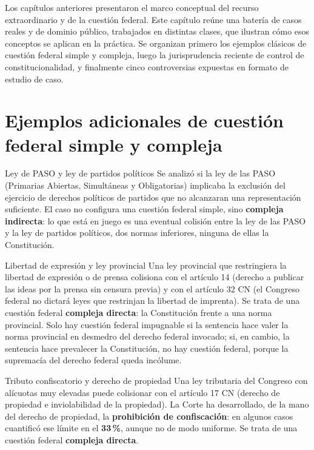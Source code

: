 \documentclass[12pt,oneside]{book}
\begin{document}
Los capítulos anteriores presentaron el marco conceptual del recurso extraordinario y de la cuestión federal. Este capítulo reúne una batería de casos reales y de dominio público, trabajados en distintas clases, que ilustran cómo esos conceptos se aplican en la práctica. Se organizan primero los ejemplos clásicos de cuestión federal simple y compleja, luego la jurisprudencia reciente de control de constitucionalidad, y finalmente cinco controversias expuestas en formato de estudio de caso.

\section{Ejemplos adicionales de cuestión federal simple y compleja}

\begin{example}{Ley de PASO y ley de partidos políticos}
Se analizó si la ley de las PASO (Primarias Abiertas, Simultáneas y Obligatorias) implicaba la exclusión del ejercicio de derechos políticos de partidos que no alcanzaran una representación suficiente. El caso no configura una cuestión federal simple, sino \textbf{compleja indirecta}: lo que está en juego es una eventual colisión entre la ley de las PASO y la ley de partidos políticos, dos normas inferiores, ninguna de ellas la Constitución.
\end{example}

\begin{example}{Libertad de expresión y ley provincial}
Una ley provincial que restringiera la libertad de expresión o de prensa colisiona con el artículo 14 (derecho a publicar las ideas por la prensa sin censura previa) y con el artículo 32 CN (el Congreso federal no dictará leyes que restrinjan la libertad de imprenta). Se trata de una cuestión federal \textbf{compleja directa}: la Constitución frente a una norma provincial. Solo hay cuestión federal impugnable si la sentencia hace valer la norma provincial en desmedro del derecho federal invocado; si, en cambio, la sentencia hace prevalecer la Constitución, no hay cuestión federal, porque la supremacía del derecho federal queda incólume.
\end{example}

\begin{example}{Tributo confiscatorio y derecho de propiedad}
Una ley tributaria del Congreso con alícuotas muy elevadas puede colisionar con el artículo 17 CN (derecho de propiedad e inviolabilidad de la propiedad). La Corte ha desarrollado, de la mano del derecho de propiedad, la \textbf{prohibición de confiscación}: en algunos casos cuantificó ese límite en el \textbf{33\,\%}, aunque no de modo uniforme. Se trata de una cuestión federal \textbf{compleja directa}.
\end{example}
\end{document}
